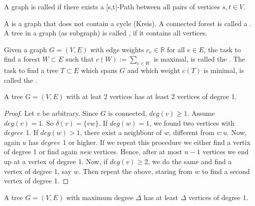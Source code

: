 \setcounter{lecture}{1}
\setcounter{section}{2}

\begin{lec}[2011-10-13]\end{lec}


\begin{defn}[connected]
A graph is called  if there exists a [s,t]-Path between all pairs of vertices $s,t \in V$.
\end{defn}

\begin{defn}
A  is a graph that does not contain a cycle (Kreis). A connected forest is called a . A tree in a graph (as subgraph) is called , if it contains all vertices.

Given a graph $G=(V,E)$ with edge weights $c_e \in \mathbb{R}$ for all $e \in E$, the task to find a forest $W \subset E$ such that $c(W):=\sum\limits_{e\in W} $ is maximal, is called the . 
The task to find a tree $T\subset E$ which spans $G$ and which weight $c(T)$ is minimal, is called the .
\end{defn}

\begin{lem}
A tree $G=(V,E)$ with at leat 2 vertices has at least 2 vertices of degree 1.
\end{lem}
\begin{proof}
Let $v$ be arbitrary. Since $G$ is connected, $deg(v) \geq 1$. Assume $deg(v)=1$. So $\delta(v)=\{vw\}$. If $deg(w)=1$, we found two vertices with $degree$ 1. If $deg(w)>1$, there exist a neighbour of $w$, different from $v:u$. Now, again $u$ has $degree$ 1 or higher. If we repeat this procedure we either find a vertix of degree 1 or find again \emph{new} vertices. Hence, after at most $n-1$ vertices we end up at a vertex of degree 1. 
Now, if $deg(v) \geq 2$, we do the same and find a vertex of degree 1, say $w$. Then repeat the above, staring from $w$ to find a second vertex of degree 1.
\end{proof}

\begin{cor}
A tree $G=(V,E)$ with maximum degree $\Delta$ has at least $\Delta$ vertices of degree 1.
\end{cor}

